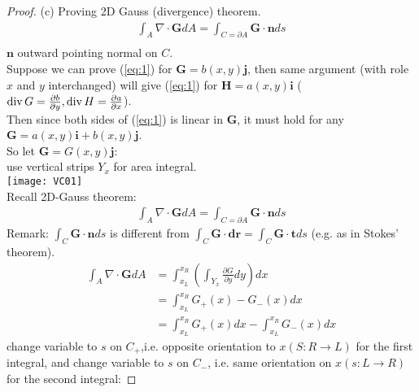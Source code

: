 \documentclass[a4paper]{article}
\begin{document}
\begin{proof}
(c) Proving 2D Gauss (divergence) theorem.
\begin{equation}\label{eq:1}
\begin{aligned}
\int_{A} \nabla\cdot\mathbf{G} dA=\int_{C=\partial A} \mathbf{G}\cdot\mathbf{n} ds\\
\end{aligned}
\end{equation}
$\mathbf{n}$ outward pointing normal on $C$.\\
Suppose we can prove (\ref{eq:1}) for $\mathbf{G}=b\left(x,y\right)\mathbf{j}$, then same argument (with role $x$ and $y$ interchanged) will give (\ref{eq:1}) for $\mathbf{H}=a\left(x,y\right)\mathbf{i}$ ($\operatorname{div} G=\frac{\partial b}{\partial y}, \operatorname{div} H = \frac{\partial a}{\partial x}$).\\
Then since both sides of (\ref{eq:1}) is linear in $\mathbf{G}$, it must hold for any $\mathbf{G}=a\left(x,y\right)\mathbf{i}+b\left(x,y\right)\mathbf{j}$.\\
So let $\mathbf{G}=G\left(x,y\right)\mathbf{j}$:\\
use vertical strips $Y_{x}$ for area integral.\\
\texttt{[image: VC01]}\\
Recall 2D-Gauss theorem:\\
\begin{equation*}
\begin{aligned}
\int_A \nabla\cdot\mathbf{G}dA = \int_{C=\partial A} \mathbf{G}\cdot\mathbf{n}ds
\end{aligned}
\end{equation*}
Remark: $\int_C \mathbf{G}\cdot\mathbf{n}ds$ is different from $\int_C \mathbf{G}\cdot\mathbf{dr} = \int_C \mathbf{G}\cdot\mathbf{t}ds$ (e.g. as in Stokes' theorem).\\
\begin{equation*}
\begin{aligned}
\int_A \nabla\cdot\mathbf{G}dA &= \int_{x_L}^{x_R} \left(\int_{Y_x} \frac{\partial G}{\partial y}dy\right) dx\\
&= \int_{x_L}^{x_R} G_+ \left(x\right) - G_- \left(x\right) dx\\
&=\int_{x_L}^{x_R} G_+ \left(x\right)dx - \int_{x_L}^{x_R} G_- \left(x\right)dx
\end{aligned}
\end{equation*}
change variable to $s$ on $C_+$,i.e. opposite orientation to $x (S:R\to L)$ for the first integral, and change variable to $s$ on $C_-$, i.e. same orientation on $x(s:L\to R)$ for the second integral:

\end{proof}
\end{document}
